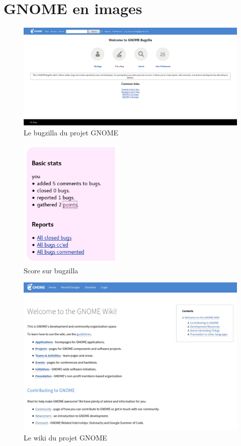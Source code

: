 \documentclass[12pt]{report}
\begin{document}
\appendix
\chapter{GNOME en images}

\begin{figure}[p]
  \caption{\label{figure_bugzilla} Le bugzilla du projet GNOME}
  \includegraphics[width=15cm]{images/bugzilla_gnome_org.png}
\end{figure}

\begin{figure}[p]
  \caption{\label{figure_bugzilla_score} Score sur bugzilla}
  \includegraphics[width=5cm]{images/score.png}
\end{figure}

\begin{figure}[p]
  \caption{\label{figure_wiki} Le wiki du projet GNOME}
  \includegraphics[width=15cm]{images/wiki_gnome_org.png}
\end{figure}
\end{document}
